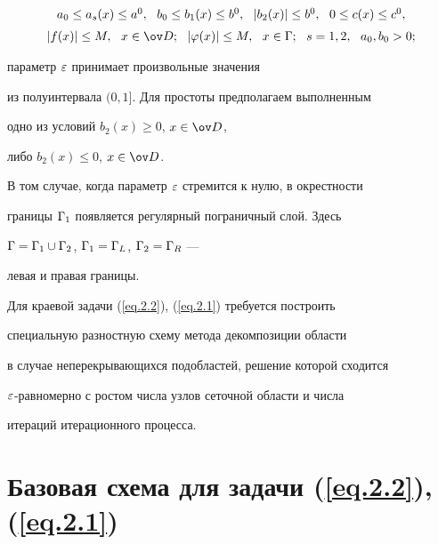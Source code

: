 \begin{equation} \label{eq.2.3}


\begin{array}{c}


a_0 \le a_s(x) \le a^0, \ \ b_0 \le b_1(x) \le b^0, \ \


|b_2(x)| \le b^0, \ \ 0 \le c(x) \le c^0, \\ [2mm]


|f(x)| \le M, \ \ x \in \od; \ \ |\vp(x)| \le M, \ \


x \in \G; \ \ s=1, 2, \ \ a_0, b_0 >0; 


\end{array}


\end{equation}


параметр $\varepsilon$ принимает произвольные значения


из полуинтервала $(0,1]$. Для простоты предполагаем выполненным


одно из условий $b_2(x) \geq 0$, $x \in \od$,


либо $b_2(x) \leq 0$, $x \in \od$.





В том случае, когда параметр $\varepsilon$ стремится к нулю, в окрестности


границы $\Gamma_1$ появляется регулярный пограничный слой. Здесь


$\Gamma=\Gamma_1\cup \Gamma_2$, $\Gamma_1=\Gamma_L$, $\Gamma_2=\Gamma_R$ ---


левая и правая границы.





Для краевой задачи (\ref{eq.2.2}), (\ref{eq.2.1}) требуется построить


специальную разностную схему метода декомпозиции области


в случае неперекрывающихся подобластей, решение которой сходится


$\varepsilon$-равномерно с ростом числа узлов сеточной области и числа


итераций итерационного процесса.\\








\section{Базовая схема для задачи (\ref{eq.2.2}), (\ref{eq.2.1})}


